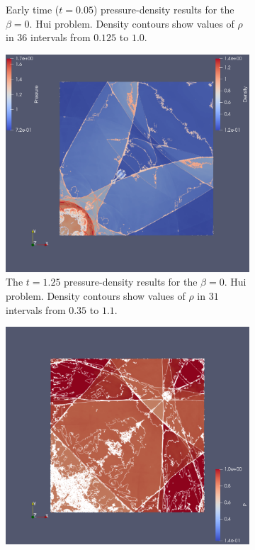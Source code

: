 \begin{figure}[h!]
\begin{subfigure}[h!]{0.4\linewidth}
\caption{Early time ($t = 0.05$) pressure-density results for the $\beta = 0.$ Hui problem. Density contours show values of $\rho$ in $36$ intervals from $0.125$ to $1.0$.}
  \label{fig:hui-Rot0-005}
\end{subfigure}

\bigskip

\begin{subfigure}[h!]{0.4\linewidth}
\centering
\includegraphics[scale=0.16]{figures/GAH-Hui-400-125.pdf }
\caption{The $t = 1.25$ pressure-density results for the $\beta = 0.$ Hui problem. Density contours show values of $\rho$ in $31$ intervals from $0.35$ to $1.1$.}
  \label{fig:hui-Rot0-125}
\end{subfigure}
\begin{subfigure}[h!]{0.4\linewidth}
\centering
\includegraphics[scale=0.16]{figures/GAH-Hui-400-250.pdf }

\end{subfigure}
\end{figure}
